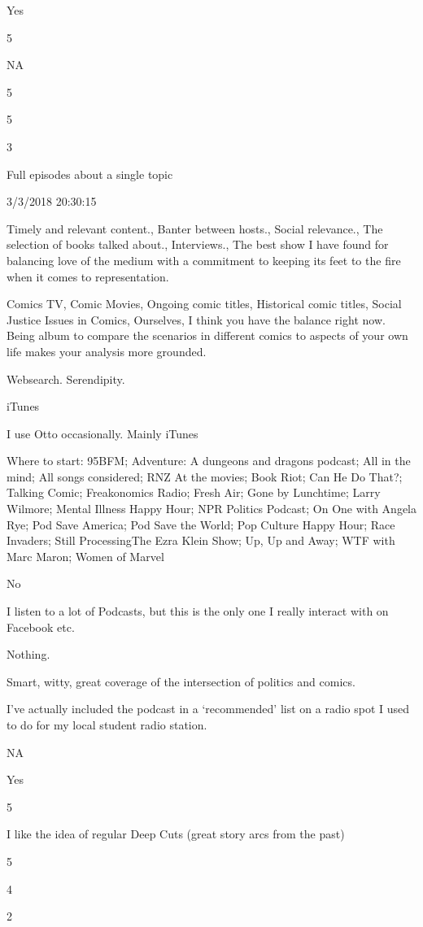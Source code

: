 \documentclass[]{article}
\begin{document}
Yes

5

NA

5

5

3

Full episodes about a single topic

3/3/2018 20:30:15

Timely and relevant content., Banter between hosts., Social relevance.,
The selection of books talked about., Interviews., The best show I have
found for balancing love of the medium with a commitment to keeping its
feet to the fire when it comes to representation.

Comics TV, Comic Movies, Ongoing comic titles, Historical comic titles,
Social Justice Issues in Comics, Ourselves, I think you have the balance
right now. Being album to compare the scenarios in different comics to
aspects of your own life makes your analysis more grounded.

Websearch. Serendipity.

iTunes

I use Otto occasionally. Mainly iTunes

Where to start: 95BFM; Adventure: A dungeons and dragons podcast; All in
the mind; All songs considered; RNZ At the movies; Book Riot; Can He Do
That?; Talking Comic; Freakonomics Radio; Fresh Air; Gone by Lunchtime;
Larry Wilmore; Mental Illness Happy Hour; NPR Politics Podcast; On One
with Angela Rye; Pod Save America; Pod Save the World; Pop Culture Happy
Hour; Race Invaders; Still ProcessingThe Ezra Klein Show; Up, Up and
Away; WTF with Marc Maron; Women of Marvel

No

I listen to a lot of Podcasts, but this is the only one I really
interact with on Facebook etc.

Nothing.

Smart, witty, great coverage of the intersection of politics and comics.

I've actually included the podcast in a `recommended' list on a radio
spot I used to do for my local student radio station.

NA

Yes

5

I like the idea of regular Deep Cuts (great story arcs from the past)

5

4

2
\end{document}
